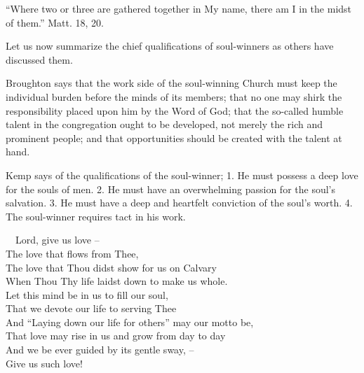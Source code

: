 \documentclass[
]{book}
\begin{document}
``Where two or three are gathered together in My name, there am I in the midst of them.'' Matt. 18, 20.

Let us now summarize the chief qualifications of soul-winners as others have discussed them.

Broughton says that the work side of the soul-winning Church must keep the individual burden before the minds of its members; that no one may shirk the responsibility placed upon him by the Word of God; that the so-called humble talent in the congregation ought to be developed, not merely the rich and prominent people; and that opportunities should be created with the talent at hand.

Kemp says of the qualifications of the soul-winner; 1. He must possess a deep love for the souls of men. 2. He must have an overwhelming passion for the soul's salvation. 3. He must have a deep and heartfelt conviction of the soul's worth. 4. The soul-winner requires tact in his work.

~~Lord, give us love --\\
\hspace*{0.333em}\hspace*{0.333em}The love that flows from Thee,\\
\hspace*{0.333em}\hspace*{0.333em}The love that Thou didst show for us on Calvary\\
\hspace*{0.333em}\hspace*{0.333em}When Thou Thy life laidst down to make us whole.\\
\hspace*{0.333em}\hspace*{0.333em}Let this mind be in us to fill our soul,\\
\hspace*{0.333em}\hspace*{0.333em}That we devote our life to serving Thee\\
\hspace*{0.333em}\hspace*{0.333em}And ``Laying down our life for others'' may our motto be,\\
\hspace*{0.333em}\hspace*{0.333em}That love may rise in us and grow from day to day\\
\hspace*{0.333em}\hspace*{0.333em}And we be ever guided by its gentle sway, --\\
\hspace*{0.333em}\hspace*{0.333em}Give us such love!
\end{document}
